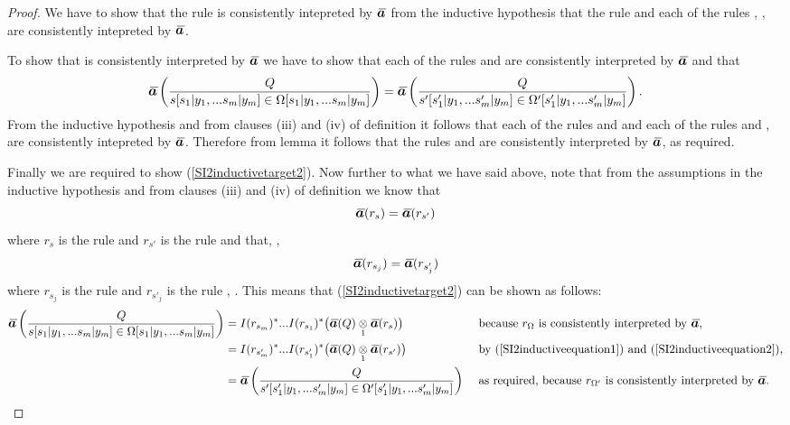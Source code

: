 \begin{proof}
We have to show that the rule \SItwoconclusion is consistently intepreted by $\Ibar$
from the inductive hypothesis  that the rule 
and each of the rules , \wherej, are consistently intepreted by $\Ibar$.

To show that \SItwoconclusion is consistently interpreted by $\Ibar$
we have to show that each of the rules \SItwoconclusionlhs and \SItwoconclusionrhs
are consistently interpreted by $\Ibar$ and that
\begin{equation}
\label{SI2inductivetarget2}
\ibarmappedrule{Q}{\ofT{s[\SUBsFORy{m}]}{\Omega[\SUBsFORy{m}]}} = \ibarmappedrule{Q}{\ofT{s'[\SUBspFORy{m}]}{\Omega'[\SUBspFORy{m}]}}.
\end{equation}
From the  inductive hypothesis  and from clauses (iii) and (iv) of definition  it follows that
each of the rules
\SItwosourcelhs
and
\SItwosourcerhs
and each of the rules
and
\wherej, are consistently intepreted by $\Ibar$. 
Therefore from lemma  it follows that
 the rules \SItwoconclusionlhs and \SItwoconclusionrhs
are consistently interpreted by $\Ibar$, as required.

Finally we are required to show (\ref{SI2inductivetarget2}).
Now further to what we have said above, note that from the assumptions in the inductive hypothesis 
and from clauses (iii) and (iv) of definition  we know that
\begin{equation}
\label{SI2inductiveequation1}
\Ibar(r_s)=\Ibar(r_{s'})
\end{equation}
where $r_s$ is the rule \SItwosourcelhs and $r_{s'}$ is the rule \SItwosourcerhs 
and that, \foreachj,
\begin{equation}
\label{SI2inductiveequation2}
\Ibar(r_{s_j})=\Ibar(r_{s'_j})
\end{equation}
where  $r_{s_j}$ is the rule 
and $r_{s'_j}$ is the rule , \foreachj.
This means that (\ref{SI2inductivetarget2}) can be shown as follows:
\begin{align*}
\ibarmappedrule{Q}{\ofT{s[\SUBsFORy{m}]}{\Omega[\SUBsFORy{m}]}} 
    &=I(r_{s_m})^* ... I(r_{s_1})^*\big( \crossx{\Ibar(Q)}{\Ibar(r_s)}{1} \big)
    &&\mbox{ because $r_\Omega$ is consistently interpreted by $\Ibar$,} \\
    &=I(r_{s'_m})^* ... I(r_{s'_1})^*\big( \crossx{\Ibar(Q)}{\Ibar(r_{s'})}{1} \big)
    &&\mbox{ by (\ref{SI2inductiveequation1}) and (\ref{SI2inductiveequation2}),} \\
    &=\ibarmappedrule{Q}{\ofT{s'[\SUBspFORy{m}]}{\Omega'[\SUBspFORy{m}]}}
    &&\mbox{ as required, because $r_{\Omega'}$ is consistently interpreted by $\Ibar$.}
\end{align*}


\end{proof}
